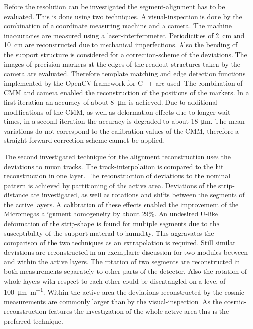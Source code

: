 \documentclass[
twoside,            %
BCOR1.4cm,          %
10pt,               %
headings=normal,    %
headsepline,        %
clearplainpage,		%
final,              %
div=14,
open=right,
bibliography=toc
]{scrreprt}
\begin{document}
Before the resolution can be investigated the segment-alignment has to be evaluated.
This is done using two techniques.
A visual-inspection is done by the combination of a coordinate measuring machine and a camera.
The machine inaccuracies are measured using a laser-interferometer.
Periodicities of \SI{2}{cm} and \SI{10}{cm} are reconstructed due to mechanical imperfections.
Also the bending of the support structure is considered for a correction-scheme of the deviations.
The images of precision markers at the edges of the readout-structures taken by the camera are evaluated. 
Therefore template matching and edge detection functions implemented by the OpenCV framework for C++ are used.
The combination of CMM and camera enabled the reconstruction of the positions of the markers. 
In a first iteration an accuracy of about \SI{8}{\micro\m} is achieved.
Due to additional modifications of the CMM, as well as deformation effects due to longer wait-times, in a second iteration the accuracy is degraded to about \SI{18}{\micro\m}. 
The mean variations do not correspond to the calibration-values of the CMM, therefore a straight forward correction-scheme cannot be applied.

The second investigated technique for the alignment reconstruction uses the deviations to muon tracks.
The track-interpolation is compared to the hit reconstruction in one layer.
The reconstruction of deviations to the nominal pattern is achieved by partitioning of the active area.
Deviations of the strip-distance are investigated, as well as rotations and shifts between the segments of the active layers.
A calibration of these effects enabled the improvement of the Micromegas alignment homogeneity by about 29\%.
An undesired U-like deformation of the strip-shape is found for multiple segments due to the susceptibility of the support material to humidity.
This aggravates the comparison of the two techniques as an extrapolation is required.
Still similar deviations are reconstructed in an exemplaric discussion for two modules between and within the active layers.
The rotation of two segments are reconstructed in both measurements separately to other parts of the detector.
Also the rotation of whole layers with respect to each other could be disentangled on a level of \SI{100}{\micro\m\per\m}.
Within the active area the deviations reconstructed by the cosmic-measurements are commonly larger than by the visual-inspection.
As the cosmic-reconstruction features the investigation of the whole active area this is the preferred technique.
\end{document}

